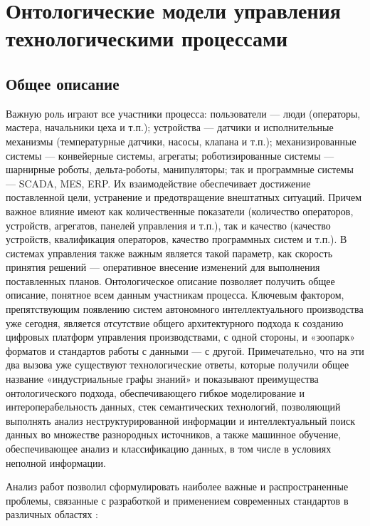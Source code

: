 \chapter{Онтологические модели управления технологическими процессами}

\section{Общее описание}

Важную роль играют все участники процесса: пользователи — люди (операторы, мастера, начальники цеха и т.п.); устройства — датчики и исполнительные механизмы (температурные датчики, насосы, клапана и т.п.); механизированные системы — конвейерные системы, агрегаты; роботизированные системы — шарнирные роботы, дельта-роботы, манипуляторы; так и программные системы — SCADA, MES, ERP. Их взаимодействие обеспечивает достижение поставленной цели, устранение и предотвращение внештатных ситуаций. Причем важное влияние имеют как количественные показатели (количество операторов, устройств, агрегатов, панелей управления и т.п.), так и качество (качество устройств, квалификация операторов, качество программных систем и т.п.). В системах управления также важным является такой параметр, как скорость принятия решений — оперативное внесение изменений для выполнения поставленных планов. Онтологическое описание позволяет получить общее описание, понятное всем данным участникам процесса.
Ключевым фактором, препятствующим появлению систем автономного интеллектуального производства уже сегодня, является отсутствие общего архитектурного подхода к созданию цифровых платформ управления производствами, с одной стороны, и «зоопарк» форматов и стандартов работы с данными — с другой. Примечательно, что на эти два вызова уже существуют технологические ответы, которые получили общее название «индустриальные графы знаний» \cite{Муромцев2019} и показывают преимущества онтологического подхода, обеспечивающего гибкое моделирование и интероперабельность данных, стек семантических технологий, позволяющий выполнять анализ неструктурированной информации и интеллектуальный поиск данных во множестве разнородных источников, а также машинное обучение, обеспечивающее анализ и классификацию данных, в том числе в условиях неполной информации.

Анализ работ позволил сформулировать наиболее важные и распространенные проблемы, связанные с разработкой и применением современных стандартов в различных областях \cite{Серенков2004, Углев2012}:

